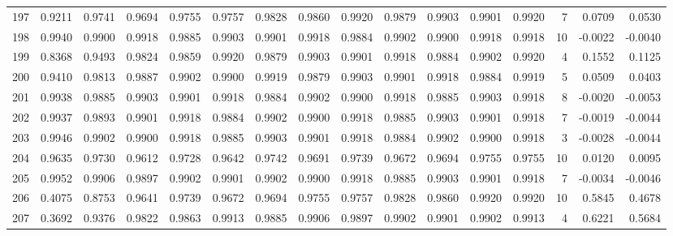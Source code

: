 \begin{tabular}{lrrrrrrrrrrrrrrr}
197 &      0.9211 &  0.9741 &  0.9694 &  0.9755 &  0.9757 &  0.9828 &  0.9860 &  0.9920 &  0.9879 &  0.9903 &   0.9901 &     0.9920 &      7 &                    0.0709 &                     0.0530 \\
198 &      0.9940 &  0.9900 &  0.9918 &  0.9885 &  0.9903 &  0.9901 &  0.9918 &  0.9884 &  0.9902 &  0.9900 &   0.9918 &     0.9918 &     10 &                   -0.0022 &                    -0.0040 \\
199 &      0.8368 &  0.9493 &  0.9824 &  0.9859 &  0.9920 &  0.9879 &  0.9903 &  0.9901 &  0.9918 &  0.9884 &   0.9902 &     0.9920 &      4 &                    0.1552 &                     0.1125 \\
200 &      0.9410 &  0.9813 &  0.9887 &  0.9902 &  0.9900 &  0.9919 &  0.9879 &  0.9903 &  0.9901 &  0.9918 &   0.9884 &     0.9919 &      5 &                    0.0509 &                     0.0403 \\
201 &      0.9938 &  0.9885 &  0.9903 &  0.9901 &  0.9918 &  0.9884 &  0.9902 &  0.9900 &  0.9918 &  0.9885 &   0.9903 &     0.9918 &      8 &                   -0.0020 &                    -0.0053 \\
202 &      0.9937 &  0.9893 &  0.9901 &  0.9918 &  0.9884 &  0.9902 &  0.9900 &  0.9918 &  0.9885 &  0.9903 &   0.9901 &     0.9918 &      7 &                   -0.0019 &                    -0.0044 \\
203 &      0.9946 &  0.9902 &  0.9900 &  0.9918 &  0.9885 &  0.9903 &  0.9901 &  0.9918 &  0.9884 &  0.9902 &   0.9900 &     0.9918 &      3 &                   -0.0028 &                    -0.0044 \\
204 &      0.9635 &  0.9730 &  0.9612 &  0.9728 &  0.9642 &  0.9742 &  0.9691 &  0.9739 &  0.9672 &  0.9694 &   0.9755 &     0.9755 &     10 &                    0.0120 &                     0.0095 \\
205 &      0.9952 &  0.9906 &  0.9897 &  0.9902 &  0.9901 &  0.9902 &  0.9900 &  0.9918 &  0.9885 &  0.9903 &   0.9901 &     0.9918 &      7 &                   -0.0034 &                    -0.0046 \\
206 &      0.4075 &  0.8753 &  0.9641 &  0.9739 &  0.9672 &  0.9694 &  0.9755 &  0.9757 &  0.9828 &  0.9860 &   0.9920 &     0.9920 &     10 &                    0.5845 &                     0.4678 \\
207 &      0.3692 &  0.9376 &  0.9822 &  0.9863 &  0.9913 &  0.9885 &  0.9906 &  0.9897 &  0.9902 &  0.9901 &   0.9902 &     0.9913 &      4 &                    0.6221 &                     0.5684 \\

\end{tabular}
